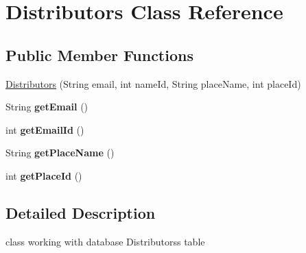 \hypertarget{classDistributors}{\section{Distributors Class Reference}
\label{classDistributors}
}
\subsection*{Public Member Functions}
\begin{DoxyCompactItemize}
\item 
\hyperlink{classDistributors_aa698d6256a1fe6b20bda3c75d47b3144}{Distributors} (String email, int name\-Id, String place\-Name, int place\-Id)
\item 
\hypertarget{classDistributors_a40a690d37ba815cc296457f95bdd2100}{String {\bfseries get\-Email} ()}\label{classDistributors_a40a690d37ba815cc296457f95bdd2100}

\item 
\hypertarget{classDistributors_a85caf840c5d204d9185e03a27bc32e68}{int {\bfseries get\-Email\-Id} ()}\label{classDistributors_a85caf840c5d204d9185e03a27bc32e68}

\item 
\hypertarget{classDistributors_ad726238f85e7b92442fed724fb253b55}{String {\bfseries get\-Place\-Name} ()}\label{classDistributors_ad726238f85e7b92442fed724fb253b55}

\item 
\hypertarget{classDistributors_abd69315f6a5f14159b95d0fe627dd0a6}{int {\bfseries get\-Place\-Id} ()}\label{classDistributors_abd69315f6a5f14159b95d0fe627dd0a6}

\end{DoxyCompactItemize}


\subsection{Detailed Description}
class working with database Distributorss table 

